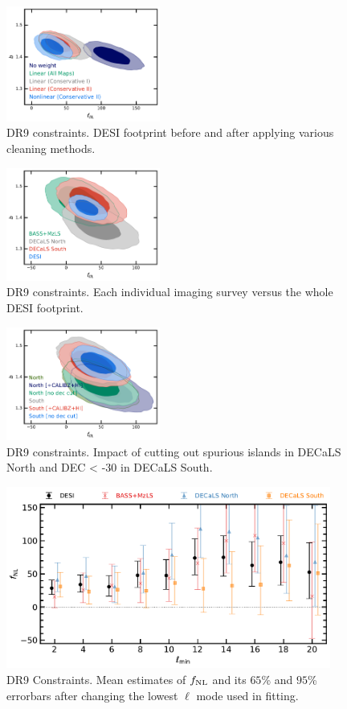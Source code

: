 \begin{figure}
    \centering
    \includegraphics[width=0.45\textwidth]{figures/mcmc_dr9methods.pdf} 
    \caption{DR9 constraints. DESI footprint before and after applying various cleaning methods.}\label{fig:mcmc_dr9}
\end{figure}

\begin{figure}
    \centering
    \includegraphics[width=0.45\textwidth]{figures/mcmc_dr9regions.pdf} 
    \caption{DR9 constraints. Each individual imaging survey versus the whole DESI footprint.}\label{fig:mcmc_dr9reg}
\end{figure}

\begin{figure}
    \centering
    \includegraphics[width=0.45\textwidth]{figures/mcmc_dr9_cutdec.pdf}     
    \caption{DR9 constraints. Impact of cutting out spurious islands in DECaLS North and DEC < -30 in DECaLS South.}\label{fig:mcmc_dr9cuts}
\end{figure}

\begin{figure}
    \centering
    \includegraphics[width=0.95\textwidth]{figures/fnl_elmin.pdf}     
    \caption{DR9 Constraints. Mean estimates of $f_{\rm NL}$ and its $65$\% and $95$\% errorbars after changing the lowest $\ell$ mode used in fitting.}\label{fig:mcmc_dr9elmin}
\end{figure}
